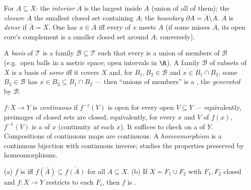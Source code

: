 \begin{definition}\label{def:b3:topology:interior}
For $A \subseteq X$: the \emph{interior} $\mathring A$ is the
largest  inside $A$ (union of all of them); the
\emph{closure} $\bar A$ the smallest closed set
containing $A$; the \emph{boundary} $\partial A = \bar A
\setminus \mathring A$. $A$ is \emph{dense} if
$\bar A = X$. One has $x \in \bar A$ iff every  of
$x$ meets $A$ (if some  misses $A$, its open core's
complement is a smaller closed set around $A$; conversely).
\end{definition}

\begin{definition}\label{def:b3:topology:basis}
A \emph{basis} of $\mathcal T$ is a
family $\mathcal B \subseteq \mathcal T$ such that every  is a union of members of $\mathcal B$ (e.g.\ open balls in a
metric space; open intervals in $\R$). A family $\mathcal B$ of
subsets of $X$ is a basis of \emph{some}  iff it covers
$X$ and, for $B_1, B_2 \in \mathcal B$ and $x \in B_1 \cap B_2$,
some $B_3 \in \mathcal B$ has $x \in B_3 \subseteq B_1\cap B_2$
--- then ``unions of members'' is a , the 
\emph{generated} by $\mathcal B$.
\end{definition}

\begin{definition}\label{def:b3:topology:continuity}
$f \colon X \to Y$ is \emph{continuous} if
$f^{-1}(V)$ is open for every open $V \subseteq Y$ ---
equivalently, preimages of closed sets are closed; equivalently,
for every $x$ and  $V$ of $f(x)$, $f^{-1}(V)$ is a
 of $x$ (continuity \emph{at} each $x$). It
suffices to check on a  of $Y$. Compositions of continuous
maps are continuous. A \emph{homeomorphism}
is a continuous bijection with continuous inverse; 
studies the properties preserved by homeomorphisms.
\end{definition}

\begin{proposition}
\label{prop:b3:topology:gluing}
(a) $f$ is  iff $f(\bar A) \subseteq \overline{f(A)}$
for all $A \subseteq X$.
(b) If $X = F_1 \cup F_2$ with $F_1, F_2$ closed and $f\colon X
\to Y$ restricts  to each $F_i$, then $f$ is
.
\end{proposition}

